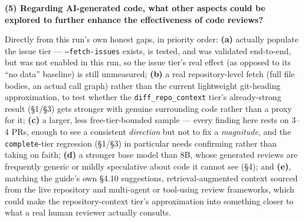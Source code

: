 \documentclass{experimentreport}
\begin{document}
{\textbf{(5) Regarding AI-generated code, what other aspects could be explored to further enhance the
effectiveness of code reviews?}

Directly from this run's own honest gaps, in priority order: \textbf{(a)} actually populate the issue
tier --- \texttt{--fetch-issues} exists, is tested, and was validated end-to-end, but was not enabled
in this run, so the issue tier's real effect (as opposed to its ``no data'' baseline) is still
unmeasured; \textbf{(b)} a real repository-level fetch (full file bodies, an actual call graph) rather
than the current lightweight git-heading approximation, to test whether the \texttt{diff\_repo\_context}
tier's already-strong result (\S1/\S3) gets stronger with genuine surrounding code rather than a proxy
for it; \textbf{(c)} a larger, less free-tier-bounded sample --- every finding here rests on 3--4 PRs,
enough to see a consistent \emph{direction} but not to fix a \emph{magnitude}, and the
\texttt{complete}-tier regression (\S1/\S3) in particular needs confirming rather than taking on faith;
\textbf{(d)} a stronger base model than 8B, whose generated reviews are frequently generic or mildly
speculative about code it cannot see (\S4); and \textbf{(e)}, matching the guide's own \S4.10
suggestions, retrieval-augmented context sourced from the live repository and multi-agent or
tool-using review frameworks, which could make the repository-context tier's approximation into
something closer to what a real human reviewer actually consults.

}


\teachercomment
\end{document}
